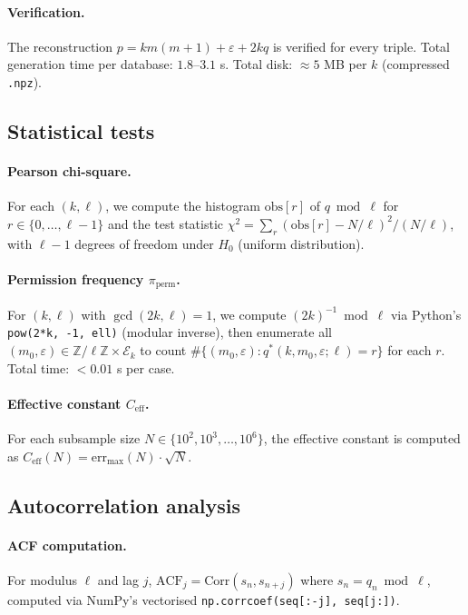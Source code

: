 \documentclass[11pt,a4paper]{article}
\theoremstyle{plain}
\theoremstyle{definition}
\newcommand{\Z}{\mathbb{Z}}
\newcommand{\PiP}{\pi_{\mathrm{perm}}}
\newcommand{\eps}{\varepsilon}
\newcommand{\Eclass}{\mathcal{E}}
\begin{document}
\paragraph{Verification.}
The reconstruction $p = km(m+1) + \eps + 2kq$ is verified for every triple.
Total generation time per database: $1.8$--$3.1$ s. Total disk: $\approx 5$ MB
per $k$ (compressed \texttt{.npz}).

\subsection{Statistical tests}

\paragraph{Pearson chi-square.}
For each $(k, \ell)$, we compute the histogram $\mathrm{obs}[r]$ of $q \bmod
\ell$ for $r \in \{0, \ldots, \ell-1\}$ and the test statistic $\chi^2 = \sum_r
(\mathrm{obs}[r] - N/\ell)^2 / (N/\ell)$, with $\ell - 1$ degrees of freedom
under $H_0$ (uniform distribution).

\paragraph{Permission frequency $\PiP$.}
For $(k, \ell)$ with $\gcd(2k, \ell) = 1$, we compute $(2k)^{-1} \bmod \ell$
via Python's \texttt{pow(2*k, -1, ell)} (modular inverse), then enumerate all
$(m_0, \eps) \in \Z/\ell\Z \times \Eclass_k$ to count $\#\{(m_0, \eps) :
q^*(k, m_0, \eps; \ell) = r\}$ for each $r$. Total time: $< 0.01$ s per case.

\paragraph{Effective constant $C_{\mathrm{eff}}$.}
For each subsample size $N \in \{10^2, 10^3, \ldots, 10^6\}$, the effective
constant is computed as $C_{\mathrm{eff}}(N) = \mathrm{err}_{\max}(N) \cdot \sqrt{N}$.

\subsection{Autocorrelation analysis}

\paragraph{ACF computation.}
For modulus $\ell$ and lag $j$, $\mathrm{ACF}_j = \mathrm{Corr}(s_n, s_{n+j})$
where $s_n = q_n \bmod \ell$, computed via NumPy's vectorised
\texttt{np.corrcoef(seq[:-j], seq[j:])}.
\end{document}
